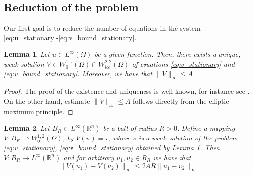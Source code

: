 \documentclass[12pt, a4paper]{article}
\theoremstyle{break}
\theoremstyle{break}
\theoremstyle{break}
\theoremstyle{break}
\theoremstyle{break}
\newtheorem{lem}{Lemma}[section]
\theoremstyle{break}
\theoremstyle{break}
\begin{document}
\subsection{Reduction of the problem} Our first goal is to reduce the number of equations in the system \eqref{eq:u_stationary}-\eqref{eq:v_bound_stationary}.
\begin{lem}
    \label{lem:existence_of_inhomogeneous_elliptic_v}
    Let $u \in L^\infty(\Omega)$ be a given function. Then, there exists a unique, weak solution $V \in W^{1,2}_0(\Omega) \cap W^{2,2}_{loc}(\Omega)$ of equations \eqref{eq:v_stationary} and \eqref{eq:v_bound_stationary}. Moreover, we have that $\|V \|_\infty \leq A$.
\end{lem}
\begin{proof}
    The proof of the existence and uniqueness is well known, for instance see \cite[Theorem 8.9]{gilbarg2001elliptic}. On the other hand, estimate $\|V\|_\infty \leq A$ follows directly from the elliptic maximum principle.
\end{proof}

\begin{lem}
    \label{lem:stationary_v_lipschitz_constant}
    Let $B_R \subset L^\infty(\mathbb{R}^n)$ be a ball of radius $R > 0$.
    Define a mapping $V : B_R \rightarrow W^{1,2}_0(\Omega)$, by $V(u) = v$, where $v$ is a weak solution of the problem \eqref{eq:v_stationary}, \eqref{eq:v_bound_stationary} obtained by Lemma \ref{lem:existence_of_inhomogeneous_elliptic_v}. Then $V: B_R \rightarrow L^\infty(\mathbb{R}^n)$ and for arbitrary $u_1, u_2 \in B_R$ we have that
    \begin{equation}
        \|V(u_1) - V(u_2)\|_\infty \leq 2 A R \|u_1 - u_2\|_\infty
    \end{equation}
\end{lem}
\end{document}
